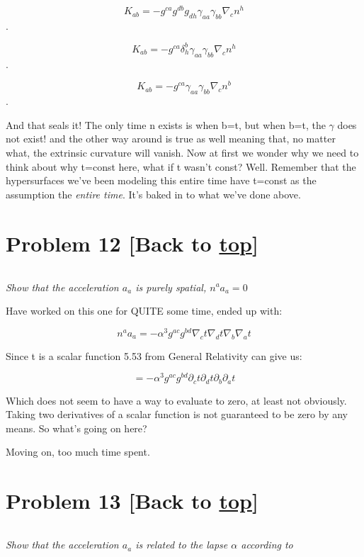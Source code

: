 \documentclass[landscape,letterpaper,10pt,english]{article}
\begin{document}
\[ K_{ab} = - g^{ca}g^{db}g_{dh} \gamma_{aa}\gamma_{bb}\nabla_c n^h \].

\[ K_{ab} = - g^{ca} \delta^b_h \gamma_{aa}\gamma_{bb}\nabla_c n^h \].

\[ K_{ab} = - g^{ca} \gamma_{aa}\gamma_{bb}\nabla_c n^b \].

    And that seals it! The only time n exists is when b=t, but when b=t, the
\(\gamma\) does not exist! and the other way around is true as well
meaning that, no matter what, the extrinsic curvature will vanish. Now
at first we wonder why we need to think about why t=const here, what if
t wasn't const? Well. Remember that the hypersurfaces we've been
modeling this entire time have t=const as the assumption the
\emph{entire time}. It's baked in to what we've done above.

    \hypertarget{problem-12-back-to-top}{%
\section{\texorpdfstring{Problem 12 {[}Back to
\hyperref[toc]{top}{]}}{Problem 12 {[}Back to {]}}}\label{problem-12-back-to-top}}

\[\label{P12}\]

\emph{Show that the acceleration \(a_a\) is purely spatial,
\(n^aa_a = 0\)}

    Have worked on this one for QUITE some time, ended up with:

\[ n^aa_a = -\alpha^3 g^{ac} g^{bd} \nabla_c t \nabla_d t \nabla_b \nabla_a t \]

Since t is a scalar function 5.53 from General Relativity can give us:

\[ = -\alpha^3 g^{ac} g^{bd} \partial_c t \partial_d t \partial_b \partial_a t \]

    Which does not seem to have a way to evaluate to zero, at least not
obviously. Taking two derivatives of a scalar function is not guaranteed
to be zero by any means. So what's going on here?

Moving on, too much time spent.

    \hypertarget{problem-13-back-to-top}{%
\section{\texorpdfstring{Problem 13 {[}Back to
\hyperref[toc]{top}{]}}{Problem 13 {[}Back to {]}}}\label{problem-13-back-to-top}}

\[\label{P13}\]

\emph{Show that the acceleration \(a_a\) is related to the lapse
\(\alpha\) according to}
\end{document}
